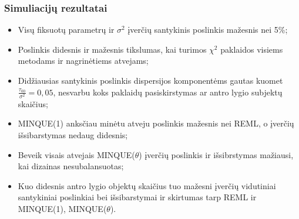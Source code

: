 \documentclass[utf8,hyperref={unicode,pdftex}]{beamer}
\begin{document}
\begin{frame}
\frametitle{Simuliacijų rezultatai}

\begin{itemize}
\item Visų fiksuotų parametrų ir $\sigma^2$ įverčių santykinis poslinkis mažesnis nei 5\%;
\item Poslinkis didesnis ir mažesnis tikslumas, kai turimos $\chi^2$ paklaidos visiems metodams ir nagrinėtiems atvejams;
\item Didžiausias santykinis poslinkis dispersijos komponentėms gautas kuomet $\frac{\tau_{00}}{\sigma^2}=0,05$, nesvarbu koks paklaidų pasiskirstymas ar antro lygio subjektų skaičius;
\item MINQUE(1) anksčiau minėtu atveju poslinkis mažesnis nei REML, o įverčių išsibarstymas nedaug didesnis;
\item Beveik visais atvejais MINQUE($\theta$) įverčių poslinkis  ir išsibrstymas mažiausi, kai dizainas nesubalansuotas;
\item Kuo didesnis antro lygio objektų skaičius tuo mažesni įverčių vidutiniai santykiniai poslinkiai bei išsibarstymai ir skirtumas tarp REML ir MINQUE(1), MINQUE($\theta$).

\end{itemize}

\end{frame}
%
\end{document}
